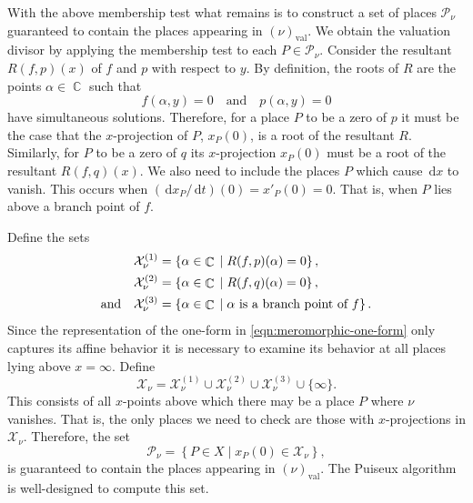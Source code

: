 \documentclass[12pt]{article}
\theoremstyle{definition}
\DeclareMathOperator{\CC}{\mathbb{C}}
\newcommand{\dx}{\,\mathrm{d}x}
\newcommand{\dt}{\,\mathrm{d}t}
\begin{document}
With the above membership test what remains is to construct a set of
places $\mathcal{P}_\nu$ guaranteed to contain the places appearing in
$(\nu)_\text{val}$. We obtain the valuation divisor by applying the
membership test to each $P \in \mathcal{P}_\nu$. Consider the resultant
$R(f,p)(x)$ of $f$ and $p$ with respect to $y$. By definition, the roots
of $R$ are the points $\alpha \in \CC$ such that
\begin{equation}
f(\alpha,y) = 0 \quad \text{and} \quad p(\alpha, y) = 0
\end{equation}
have simultaneous solutions. Therefore, for a place $P$ to be a zero of
$p$ it must be the case that the $x$-projection of $P$, $x_P(0)$, is a
root of the resultant $R$. Similarly, for $P$ to be a zero of $q$ its
$x$-projection $x_P(0)$ must be a root of the resultant $R(f,q)(x)$. We
also need to include the places $P$ which cause $\dx$ to vanish. This
occurs when $(\dx_P/\dt)(0) = x'_P(0) = 0$. That is, when $P$ lies above
a branch point of $f$.

Define the sets
\begin{align}
  \mathcal{X}_\nu^{(1)}
  &=
  \left\{
  \alpha \in \CC \; | \; R(f,p)(\alpha) = 0
  \right\}, \notag \\
  \mathcal{X}_\nu^{(2)}
  &=
  \left\{
  \alpha \in \CC \; | \; R(f,q)(\alpha) = 0
  \right\}, \notag \\
  \text{and} \quad \mathcal{X}_\nu^{(3)}
  &=
  \left\{ \alpha \in \CC \; | \; \alpha \text{ is
    a branch point of $f$} \right\}.
\end{align}
Since the representation of the one-form in
\eqref{eqn:meromorphic-one-form} only captures its affine behavior it is
necessary to examine its behavior at all places lying above
$x=\infty$. Define
\begin{equation}
\mathcal{X}_\nu
=
\mathcal{X}_\nu^{(1)} \cup
\mathcal{X}_\nu^{(2)} \cup
\mathcal{X}_\nu^{(3)} \cup
\{ \infty \}.
\end{equation}
This consists of all $x$-points above which there may be a place $P$
where $\nu$ vanishes. That is, the only places we need to check are
those with $x$-projections in $\mathcal{X}_\nu$. Therefore, the set
\begin{equation}
\mathcal{P}_\nu =
\left\{ P \in X \; | \; x_P(0) \in \mathcal{X}_\nu
\right\},
\end{equation}
is guaranteed to contain the places appearing in $(\nu)_\text{val}$. The
Puiseux algorithm is well-designed to compute this set.
\end{document}

